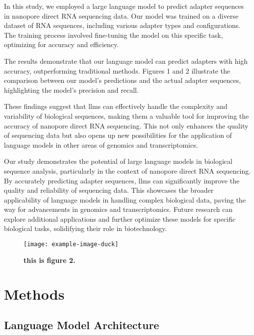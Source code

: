 \documentclass[pdflatex, sn-mathphys-num, lineno]{sn-jnl}%
\theoremstyle{thmstyleone}%
\theoremstyle{thmstyletwo}%
\theoremstyle{thmstylethree}%
\begin{document}
In this study, we employed a large language model to predict adapter sequences in nanopore direct RNA sequencing data.
Our model was trained on a diverse dataset of RNA sequences, including various adapter types and configurations.
The training process involved fine-tuning the model on this specific task, optimizing for accuracy and efficiency.

The results demonstrate that our language model can predict adapters with high accuracy, outperforming traditional methods.
Figures 1 and 2 illustrate the comparison between our model's predictions and the actual adapter sequences, highlighting the model's precision and recall.

These findings suggest that \glspl{llm} can effectively handle the complexity and variability of biological sequences, making them a valuable tool for improving the accuracy of nanopore direct RNA sequencing.
This not only enhances the quality of sequencing data but also opens up new possibilities for the application of language models in other areas of genomics and transcriptomics.


Our study demonstrates the potential of large language models in biological sequence analysis, particularly in the context of nanopore direct RNA sequencing.
By accurately predicting adapter sequences,  \glspl{llm} can significantly improve the quality and reliability of sequencing data.
This showcases the broader applicability of language models in handling complex biological data, paving the way for advancements in genomics and transcriptomics.
Future research can explore additional applications and further optimize these models for specific biological tasks, solidifying their role in biotechnology.


\begin{figure}[!h]
	\texttt{[image: example-image-duck]}
	\caption{\bf this is figure 2.}
	\label{fig:f2}
\end{figure}


\section{Methods}\label{sec2}

\subsection{Language Model Architecture}
\end{document}
